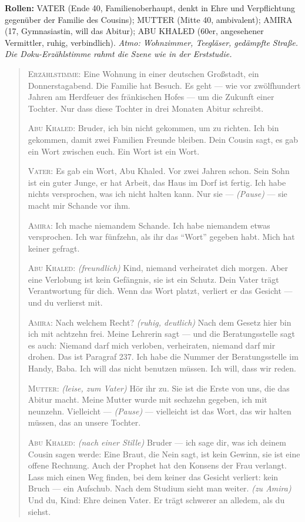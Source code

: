 \documentclass[11pt,a4paper,ngerman]{scrartcl}
\begin{document}
\textbf{Rollen:} VATER (Ende 40, Familienoberhaupt, denkt in Ehre und Verpflichtung gegenüber der Familie des Cousins); MUTTER (Mitte 40, ambivalent); AMIRA (17, Gymnasiastin, will das Abitur); ABU KHALED (60er, angesehener Vermittler, ruhig, verbindlich). \emph{Atmo: Wohnzimmer, Teegläser, gedämpfte Straße. Die Doku-Erzählstimme rahmt die Szene wie in der Erststudie.}

\begin{quotation}\small
\textsc{Erzählstimme:} Eine Wohnung in einer deutschen Großstadt, ein Donnerstagabend. Die Familie hat Besuch. Es geht --- wie vor zwölfhundert Jahren am Herdfeuer des fränkischen Hofes --- um die Zukunft einer Tochter. Nur dass diese Tochter in drei Monaten Abitur schreibt.

\textsc{Abu Khaled:} Bruder, ich bin nicht gekommen, um zu richten. Ich bin gekommen, damit zwei Familien Freunde bleiben. Dein Cousin sagt, es gab ein Wort zwischen euch. Ein Wort ist ein Wort.

\textsc{Vater:} Es gab ein Wort, Abu Khaled. Vor zwei Jahren schon. Sein Sohn ist ein guter Junge, er hat Arbeit, das Haus im Dorf ist fertig. Ich habe nichts versprochen, was ich nicht halten kann. Nur sie --- \emph{(Pause)} --- sie macht mir Schande vor ihm.

\textsc{Amira:} Ich mache niemandem Schande. Ich habe niemandem etwas versprochen. Ich war fünfzehn, als ihr das \enquote{Wort} gegeben habt. Mich hat keiner gefragt.

\textsc{Abu Khaled:} \emph{(freundlich)} Kind, niemand verheiratet dich morgen. Aber eine Verlobung ist kein Gefängnis, sie ist ein Schutz. Dein Vater trägt Verantwortung für dich. Wenn das Wort platzt, verliert er das Gesicht --- und du verlierst mit.

\textsc{Amira:} Nach welchem Recht? \emph{(ruhig, deutlich)} Nach dem Gesetz hier bin ich mit achtzehn frei. Meine Lehrerin sagt --- und die Beratungsstelle sagt es auch: Niemand darf mich verloben, verheiraten, niemand darf mir drohen. Das ist Paragraf 237. Ich habe die Nummer der Beratungsstelle im Handy, Baba. Ich will das nicht benutzen müssen. Ich will, dass wir reden.

\textsc{Mutter:} \emph{(leise, zum Vater)} Hör ihr zu. Sie ist die Erste von uns, die das Abitur macht. Meine Mutter wurde mit sechzehn gegeben, ich mit neunzehn. Vielleicht --- \emph{(Pause)} --- vielleicht ist das Wort, das wir halten müssen, das an unsere Tochter.

\textsc{Abu Khaled:} \emph{(nach einer Stille)} Bruder --- ich sage dir, was ich deinem Cousin sagen werde: Eine Braut, die Nein sagt, ist kein Gewinn, sie ist eine offene Rechnung. Auch der Prophet hat den Konsens der Frau verlangt. Lass mich einen Weg finden, bei dem keiner das Gesicht verliert: kein Bruch --- ein Aufschub. Nach dem Studium sieht man weiter. \emph{(zu Amira)} Und du, Kind: Ehre deinen Vater. Er trägt schwerer an alledem, als du siehst.


\end{quotation}
\end{document}
